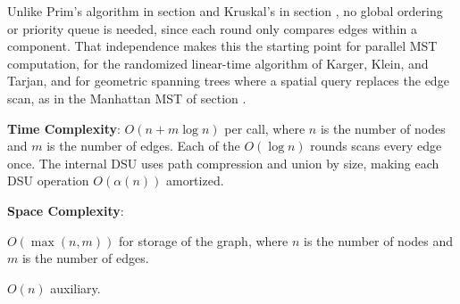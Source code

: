 Unlike Prim's algorithm in section  and Kruskal's in section , no global ordering or priority queue is needed, since each round only compares edges within a component. That independence makes this the starting point for parallel MST computation, for the randomized linear-time algorithm of Karger, Klein, and Tarjan, and for geometric spanning trees where a spatial query replaces the edge scan, as in the Manhattan MST of section .

\textbf{Time Complexity}: $O(n + m \log n)$ per call, where $n$ is the number of nodes and $m$ is the number of edges. Each of the $O(\log n)$ rounds scans every edge once. The internal DSU uses path compression and union by size, making each DSU operation $O(\alpha\left(n\right))$ amortized.

\textbf{Space Complexity}:
\begin{compactitem}
  \item $O(\max\left(n, m\right))$ for storage of the graph, where $n$ is the number of nodes and $m$ is the number of edges.
  \item $O(n)$ auxiliary.
\end{compactitem}

